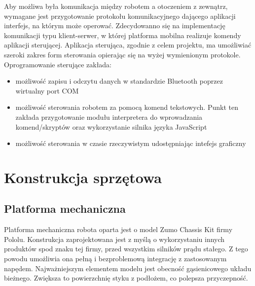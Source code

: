 \documentclass[eng,printmode]{mgr}
\begin{document}
Aby możliwa była komunikacja między robotem a otoczeniem z zewnątrz, wymagane jest przygotowanie protokołu komunikacyjnego dającego aplikacji interfejs, na którym może operować. Zdecydowanno się na implementację komunikacji typu klient-serwer, w której platforma mobilna realizuje komendy aplikacji sterującej. Aplikacja sterująca, zgodnie z celem projektu, ma umożliwiać szeroki zakres form sterowania opierając się na wyżej wymienionym protokole. Oprogramowanie sterujące zakłada:
\begin{itemize}
  \item możliwość zapisu i odczytu danych w standardzie Bluetooth poprzez wirtualny port COM
  \item możliwość sterowania robotem za pomocą komend tekstowych. Punkt ten zakłada przygotowanie modułu interpretera do wprowadzania komend/skryptów oraz wykorzystanie silnika języka JavaScript
  \item możliwość sterowania w czasie rzeczywistym udostępniając intefejs graficzny
\end{itemize}

\chapter{Konstrukcja sprzętowa}

 \section{Platforma mechaniczna}

Platforma mechaniczna robota oparta jest o model Zumo Chassis Kit firmy Pololu. Konstrukcja zaprojektowana jest z myślą o wykorzystaniu innych produktów spod znaku tej firmy, przed wszystkim silników prądu stałego. Z tego powodu umożliwia ona pełną i bezproblemową integrację z zastosowanym napędem. Najważniejszym elementem modelu jest obecność gąsienicowego układu bieżnego. Zwiększa to powierzchnię styku z podłożem, co polepsza przyczepność.
\end{document}
